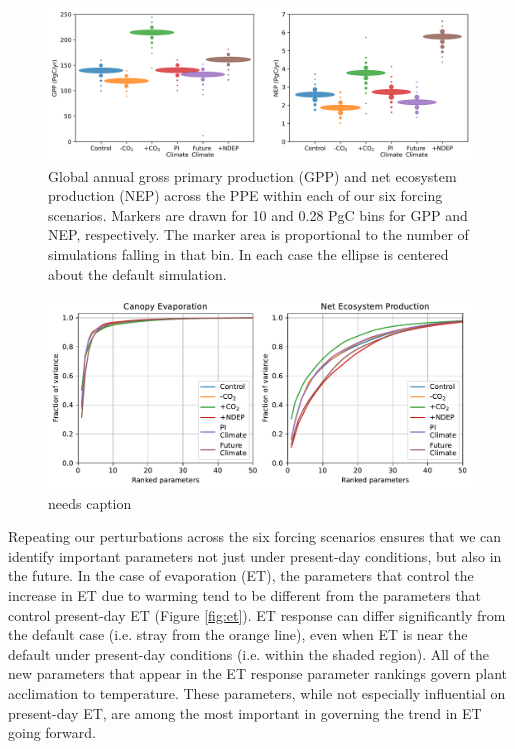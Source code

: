 \documentclass[draft]{agujournal2019}
\begin{document}
\begin{figure}[h]
\centering
\includegraphics[width=\textwidth]{../figs/violins.png}
\caption{Global annual gross primary production (GPP) and net ecosystem production (NEP) across the PPE within each of our six forcing scenarios. Markers are drawn for 10 and 0.28 PgC bins for GPP and NEP, respectively. The marker area is proportional to the number of simulations falling in that bin. In each case the ellipse is centered about the default simulation.}
\label{fig:violins}
\end{figure}

\begin{figure}[h]
\centering
\includegraphics[width=\textwidth]{../figs/variance.pdf}
\caption{needs caption}
\label{fig:violins}
\end{figure}

Repeating our perturbations across the six forcing scenarios ensures that we can identify important parameters not just under present-day conditions, but also in the future. In the case of evaporation (ET), the parameters that control the increase in ET due to warming tend to be different from the parameters that control present-day ET (Figure \ref{fig:et}). 
ET response can differ significantly from the default case (i.e. stray from the orange line), even when ET is near the default under present-day conditions (i.e. within the shaded region).
All of the new parameters that appear in the ET response parameter rankings govern plant acclimation to temperature. 
These parameters, while not especially influential on present-day ET, are among the most important in governing the trend in ET going forward.
\end{document}
